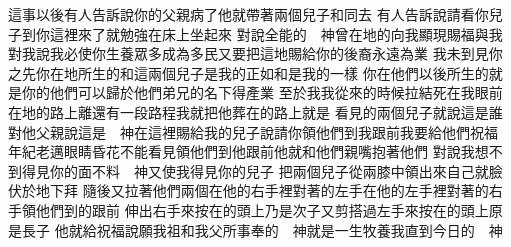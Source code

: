 \bchapter%
這事以後\chientien 有人告訴說\chientien 你的父親病了\yuentien 他就帶著兩個兒子和同去\chuan 
{}有人告訴說\chientien 請看\chientien 你兒子到你這裡來了\yuentien{}就勉強在床上坐起來\chuan 
{}對說\chientien 全能的　神曾在地的向我顯現\chientien 賜福與我\chuan 
{}對我說\chientien 我必使你生養眾多\chientien 成為多民\chientien 又要把這地賜給你的後裔\chientien 永遠為業\chuan 
{}我未到見你之先\chientien 你在地所生的和\chientien 這兩個兒子是我的\yuentien 正如和是我的一樣\chuan 
{}你在他們以後所生的\chientien 就是你的\chientien 他們可以歸於他們弟兄的名下得產業\chuan 
{}至於我\chientien 我從來的時候\chientien 拉結死在我眼前\chientien 在地的路上\chientien 離還有一段路程\chientien 我就把他葬在的路上\yuentien{}就是\chuan\Chuan
{}看見的兩個兒子\chientien 就說\chientien 這是誰\chuan 
{}對他父親說\chientien 這是　神在這裡賜給我的兒子\yuentien{}說\chientien 請你領他們到我跟前\chientien 我要給他們祝福\chuan 
{}年紀老邁\chientien 眼睛昏花\chientien 不能看見\chientien{}領他們到他跟前\chientien 他就和他們親嘴\chientien 抱著他們\chuan 
{}對說\chientien 我想不到得見你的面\chientien 不料\chientien 　神又使我得見你的兒子\chuan 
{}把兩個兒子從兩膝中領出來\chientien 自己就臉伏於地下拜\chuan 
{}隨後又拉著他們兩個\chientien{}在他的右手裡\chientien 對著的左手\chientien{}在他的左手裡\chientien 對著的右手\chientien 領他們到的跟前\chuan 
{}伸出右手來\chientien 按在的頭上\yuentien{}乃是次子\chientien 又剪搭過左手來\chientien 按在的頭上\chientien{}原是長子\yuentien 
{}他就給祝福\chientien 說\chientien 願我祖\chientien 和我父所事奉的　神\chientien 就是一生牧養我直到今日的　神\chientien 
